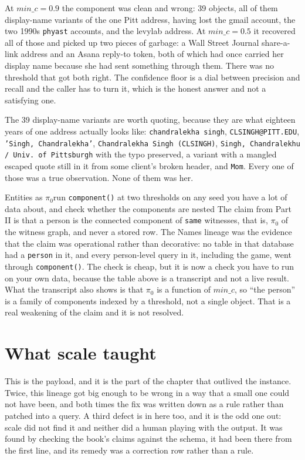 At $min\_c = 0.9$ the component was clean and wrong: 39 objects, all of them display-name variants of the one Pitt address, having lost the gmail account, the two 1990s \texttt{phyast} accounts, and the levylab address. At $min\_c = 0.5$ it recovered all of those and picked up two pieces of garbage: a Wall Street Journal share-a-link address and an Asana reply-to token, both of which had once carried her display name because she had sent something through them. There was no threshold that got both right. The confidence floor is a dial between precision and recall and the caller has to turn it, which is the honest answer and not a satisfying one.

The 39 display-name variants are worth quoting, because they are what eighteen years of one address actually looks like: \texttt{chandralekha singh}, \texttt{CLSINGH@PITT.EDU}, \texttt{'Singh, Chandralekha'}, \texttt{Chandralekha Singh (CLSINGH)}, \texttt{Singh, Chandralekhu / Univ. of Pittsburgh} with the typo preserved, a variant with a mangled escaped quote still in it from some client's broken header, and \texttt{Mom}. Every one of those was a true observation. None of them was her.

\begin{Correspondence}{Entities as $\pi_0$}{run \texttt{component()} at two thresholds on any seed you have a lot of data about, and check whether the components are nested}
The claim from Part II is that a person is the connected component of \texttt{same} witnesses, that is, $\pi_0$ of the witness graph, and never a stored row. The Names lineage was the evidence that the claim was operational rather than decorative: no table in that database had a \texttt{person} in it, and every person-level query in it, including the game, went through \texttt{component()}. The check is cheap, but it is now a check you have to run on your own data, because the table above is a transcript and not a live result. What the transcript also shows is that $\pi_0$ is a function of $min\_c$, so ``the person'' is a family of components indexed by a threshold, not a single object. That is a real weakening of the claim and it is not resolved.
\end{Correspondence}

\section{What scale taught}

This is the payload, and it is the part of the chapter that outlived the instance. Twice, this lineage got big enough to be wrong in a way that a small one could not have been, and both times the fix was written down as a rule rather than patched into a query. A third defect is in here too, and it is the odd one out: scale did not find it and neither did a human playing with the output. It was found by checking the book's claims against the schema, it had been there from the first line, and its remedy was a correction row rather than a rule.


